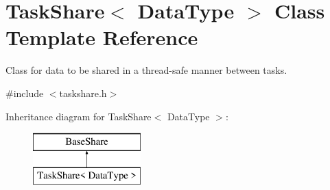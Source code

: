 \hypertarget{class_task_share}{}\section{Task\+Share$<$ Data\+Type $>$ Class Template Reference}
\label{class_task_share}


Class for data to be shared in a thread-\/safe manner between tasks.  




{\ttfamily \#include $<$taskshare.\+h$>$}

Inheritance diagram for Task\+Share$<$ Data\+Type $>$\+:\begin{figure}[H]
\begin{center}
\leavevmode
\includegraphics[height=2.000000cm]{class_task_share}
\end{center}
\end{figure}

